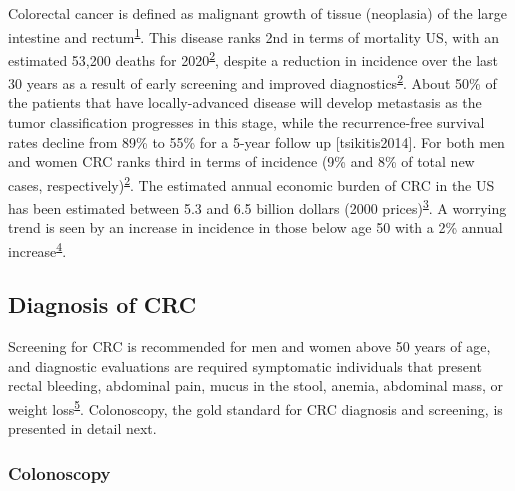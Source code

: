 \documentclass[11pt]{umnthesis}
\begin{document}
Colorectal cancer is defined as malignant growth of tissue (neoplasia) of the large intestine and rectum\textsuperscript{\protect\hyperlink{ref-moeslein2001}{1}}. This disease ranks 2nd in terms of mortality US, with an estimated 53,200 deaths for 2020\textsuperscript{\protect\hyperlink{ref-siegel2020}{2}}, despite a reduction in incidence over the last 30 years as a result of early screening and improved diagnostics\textsuperscript{\protect\hyperlink{ref-siegel2020}{2}}. About 50\% of the patients that have locally-advanced disease will develop metastasis as the tumor classification progresses in this stage, while the recurrence-free survival rates decline from 89\% to 55\% for a 5-year follow up {[}tsikitis2014{]}. For both men and women CRC ranks third in terms of incidence (9\% and 8\% of total new cases, respectively)\textsuperscript{\protect\hyperlink{ref-siegel2020}{2}}. The estimated annual economic burden of CRC in the US has been estimated between 5.3 and 6.5 billion dollars (2000 prices)\textsuperscript{\protect\hyperlink{ref-jansman2007}{3}}. A worrying trend is seen by an increase in incidence in those below age 50 with a 2\% annual increase\textsuperscript{\protect\hyperlink{ref-benson2020}{4}}.

\hypertarget{diagnosis-of-crc}{%
\subsection{Diagnosis of CRC}\label{diagnosis-of-crc}}

Screening for CRC is recommended for men and women above 50 years of age, and diagnostic evaluations are required symptomatic individuals that present rectal bleeding, abdominal pain, mucus in the stool, anemia, abdominal mass, or weight loss\textsuperscript{\protect\hyperlink{ref-mccormick2002}{5}}. Colonoscopy, the gold standard for CRC diagnosis and screening, is presented in detail next.

\hypertarget{colonoscopy}{%
\subsubsection{Colonoscopy}\label{colonoscopy}}
\end{document}
